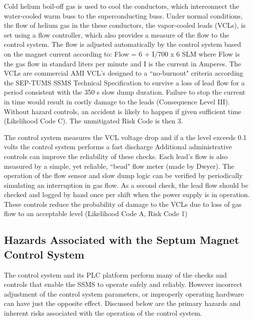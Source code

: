 Cold helium boil-off gas is used to cool the conductors, which interconnect the water-cooled warm buss to 
the superconducting buss.  Under normal conditions, the flow of helium gas in the these conductors, the 
vapor-cooled leads (VCLs), is set using a flow controller, which also provides a measure of the flow to 
the control system.  The flow is adjusted automatically by the control system based on the magnet current 
according to:
Flow = 6 +   I/700 x 6 SLM
where Flow is the gas flow in standard liters per minute and I is the current in Amperes.  The VCLs are 
commercial AMI VCL's  designed  to a ``no-burnout" criteria according the SEP-TUMS SSMS Technical Specification 
to survive a loss of lead flow for a period consistent with the 350 s slow dump duration.  Failure to stop the 
current in time would result in costly damage to the leads (Consequence Level III).  Without hazard controls, 
an accident is likely to happen if given sufficient time (Likelihood Code C).  The unmitigated Risk Code is then 3.

The control system measures the VCL voltage drop and if a the level exceeds 0.1 volts the control system performs 
a fast discharge  Additional administrative controls can improve the reliability of these checks.  Each lead's 
flow is also measured by a simple, yet reliable, ``bead" flow meter (made by Dwyer).  The operation of the flow 
sensor and slow dump logic can be verified by periodically simulating an interruption in gas flow.  As a second 
check, the lead flow should be checked and logged by hand once per shift when the power supply is in operation.  
These controls reduce the probability of damage to the VCLs due to loss of gas flow to an acceptable level 
(Likelihood Code A, Risk Code 1) 




\begin{safetyen}{10}{15}
\subsection {\bf Hazards Associated with the Septum Magnet Control System}
\end{safetyen}

The control system and its PLC platform perform many of the checks and controls that enable the SSMS to operate 
safely and reliably.  However incorrect adjustment of the control system parameters, or improperly operating 
hardware can have just the opposite effect.  Discussed below are the primary hazards and inherent risks 
associated with the operation of the control system.

